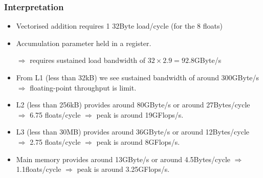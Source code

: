 \documentclass[dvipsnames,presentation,aspectratio=169,14pt]{beamer}
\begin{document}
\begin{frame}
  \frametitle{Interpretation}
  \begin{itemize}
  \item Vectorised addition requires 1 32Byte load/cycle (for the 8
    floats)
  \item Accumulation parameter held in a register.
  \item[$\Rightarrow$] requires sustained load bandwidth of $32\times
    2.9 = 92.8$GByte/s
  \item From L1 (less than 32kB) we see sustained bandwidth of around
    300GByte/s $\Rightarrow$ floating-point throughput is limit.
  \item L2 (less than 256kB) provides around 80GByte/s or around
    27Bytes/cycle $\Rightarrow$ 6.75 floats/cycle $\Rightarrow$ peak
    is around 19GFlops/s.
  \item L3 (less than 30MB) provides around 36GByte/s or around
    12Bytes/cycle $\Rightarrow$ 2.75 floats/cycle $\Rightarrow$ peak
    is around 8GFlops/s.
  \item Main memory provides around 13GByte/s or around 4.5Bytes/cycle
    $\Rightarrow$ 1.1floats/cycle $\Rightarrow$ peak is around 3.25GFlops/s.
  \end{itemize}
\end{frame}
\end{document}

